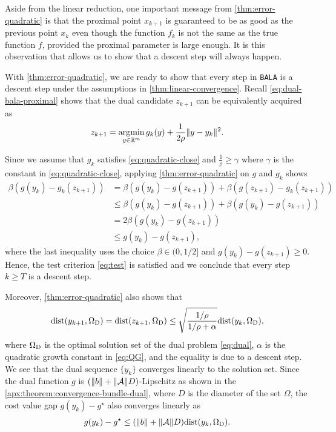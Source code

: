 \documentclass[11pt]{article}
\newcommand{\alg}{\texttt{BALA}}%
\begin{document}
Aside from the linear reduction, one important message from \cref{thm:error-quadratic} is that the proximal point $x_{k+1}$ is guaranteed to be as good as the previous point $x_k$ even though the function $f_k$ is not the same as the true function $f$, provided the proximal parameter is large enough. It is this observation that allows us to show that a descent step will always happen.

With \cref{thm:error-quadratic}, we are ready to show that every step in \alg{} is a descent step under the assumptions in \cref{thm:linear-convergence}. Recall \cref{eq:dual-bala-proximal} shows that the dual candidate $z_{k+1}$ can be equivalently acquired as $$z_{k+1} = \operatorname*{\arg\!\min}_{y \in \mathbb{R}^m} g_{k}(y) + \frac{1}{2\rho}\|y- y_k\|^2.$$

Since we assume that $g_k$ satisfies \eqref{eq:quadratic-close} and $\frac{1}{\rho} \geq \gamma$ where $\gamma$ is the constant in \eqref{eq:quadratic-close}, applying \cref{thm:error-quadratic} on $g$ and $g_k$ shows
\begin{align*}
    \beta (g(y_k) - g_k(z_{k+1})) & = \beta (g(y_k) -g(z_{k+1})) + \beta (g(z_{k+1}) - g_k(z_{k+1}))  \\
    & \leq \beta (g(y_k) -g(z_{k+1})) + \beta( g(y_k)  - g(z_{k+1})) \\
    & = 2 \beta (g(y_k) -g(z_{k+1}))\\
    & \leq  g(y_k) -g(z_{k+1}),
\end{align*}
where the last inequality uses the choice $\beta \in (0,1/2]$ and $g(y_k) - g(z_{k+1}) \geq 0$. 
Hence, the test criterion \eqref{eq:test} is satisfied and we conclude that every step $k \geq T$ is a descent step.

Moreover, \cref{thm:error-quadratic} also shows that 
\begin{align*}
   \mathrm{dist}(y_{k+1},\Omega_{\mathrm{D}}) = \mathrm{dist}(z_{k+1},\Omega_{\mathrm{D}}) \leq \sqrt{\frac{1/\rho}{1/\rho +\alpha}}\mathrm{dist}(y_k,\Omega_{\mathrm{D}}),
\end{align*}
where $\Omega_{\mathrm{D}}$ is the optimal solution set of the dual problem \eqref{eq:dual}, $\alpha$ is the quadratic growth constant in \eqref{eq:QG}, and the equality is due to a descent step. We see that the dual sequence $\{y_k\}$ converges linearly to the solution set. Since the dual function $g$ is $(\|b\| + \|\mathcal{A}\|D)$-Lipschitz as shown in the \cref{apx:theorem:convergence-bundle-dual}, where $D$ is the diameter of the set $\Omega$, the cost value gap $g(y_k) - g^\star$ also converges linearly as 
\begin{align}
    g(y_k) - g^\star \leq(\|b\| + \|\mathcal{A}\|D) \mathrm{dist}(y_k,\Omega_{\mathrm{D}}). \label{eq:linear-reduction-g}
\end{align}
\end{document}
